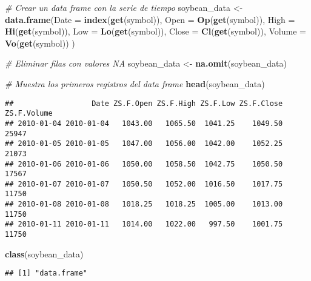 \documentclass[
]{book}
\newenvironment{Shaded}{\begin{snugshade}}{\end{snugshade}}
\newcommand{\AttributeTok}[1]{\textcolor[rgb]{0.13,0.29,0.53}{#1}}
\newcommand{\CommentTok}[1]{\textcolor[rgb]{0.56,0.35,0.01}{\textit{#1}}}
\newcommand{\FunctionTok}[1]{\textcolor[rgb]{0.13,0.29,0.53}{\textbf{#1}}}
\newcommand{\NormalTok}[1]{#1}
\newcommand{\OtherTok}[1]{\textcolor[rgb]{0.56,0.35,0.01}{#1}}
\begin{document}
\begin{Shaded}
\begin{Highlighting}[]
\CommentTok{\# Crear un data frame con la serie de tiempo}
\NormalTok{soybean\_data }\OtherTok{\textless{}{-}} \FunctionTok{data.frame}\NormalTok{(}\AttributeTok{Date =} \FunctionTok{index}\NormalTok{(}\FunctionTok{get}\NormalTok{(symbol)), }
                           \AttributeTok{Open =} \FunctionTok{Op}\NormalTok{(}\FunctionTok{get}\NormalTok{(symbol)),}
                           \AttributeTok{High =} \FunctionTok{Hi}\NormalTok{(}\FunctionTok{get}\NormalTok{(symbol)),}
                           \AttributeTok{Low =} \FunctionTok{Lo}\NormalTok{(}\FunctionTok{get}\NormalTok{(symbol)),}
                           \AttributeTok{Close =} \FunctionTok{Cl}\NormalTok{(}\FunctionTok{get}\NormalTok{(symbol)),}
                           \AttributeTok{Volume =} \FunctionTok{Vo}\NormalTok{(}\FunctionTok{get}\NormalTok{(symbol))}
\NormalTok{                           )}

\CommentTok{\# Eliminar filas con valores NA}
\NormalTok{soybean\_data }\OtherTok{\textless{}{-}} \FunctionTok{na.omit}\NormalTok{(soybean\_data)}

\CommentTok{\# Muestra los primeros registros del data frame}
\FunctionTok{head}\NormalTok{(soybean\_data)}
\end{Highlighting}
\end{Shaded}

\begin{verbatim}
##                  Date ZS.F.Open ZS.F.High ZS.F.Low ZS.F.Close ZS.F.Volume
## 2010-01-04 2010-01-04   1043.00   1065.50  1041.25    1049.50       25947
## 2010-01-05 2010-01-05   1047.00   1056.00  1042.00    1052.25       21073
## 2010-01-06 2010-01-06   1050.00   1058.50  1042.75    1050.50       17567
## 2010-01-07 2010-01-07   1050.50   1052.00  1016.50    1017.75       11750
## 2010-01-08 2010-01-08   1018.25   1018.25  1005.00    1013.00       11750
## 2010-01-11 2010-01-11   1014.00   1022.00   997.50    1001.75       11750
\end{verbatim}

\begin{Shaded}
\begin{Highlighting}[]
\FunctionTok{class}\NormalTok{(soybean\_data)}
\end{Highlighting}
\end{Shaded}

\begin{verbatim}
## [1] "data.frame"
\end{verbatim}
\end{document}
